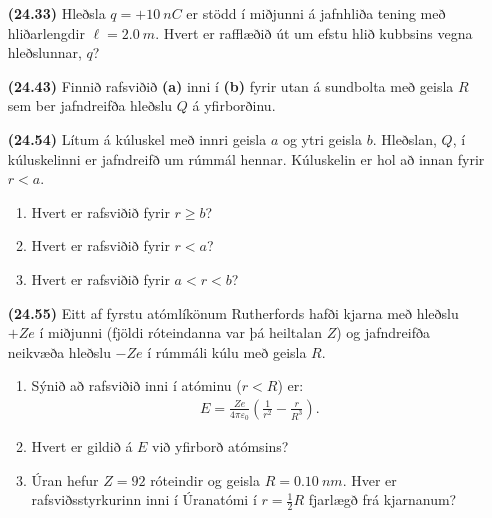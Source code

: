 \ifdefined \wholebook \else\documentclass[oneside]{book}\usepackage{EdlBook}\graphicspath{{figures/}}
\begin{document}
\begin{enumerate}[label = \textbf{(\alph*)}]

\item[\textbf{(24.33)}] Hleðsla $q = +\SI{10}{nC}$ er stödd í miðjunni á jafnhliða tening með hliðarlengdir $\ell = \SI{2.0}{m}$. Hvert er rafflæðið út um efstu hlið kubbsins vegna hleðslunnar, $q$?

\item[\textbf{(24.43)}] Finnið rafsviðið \textbf{(a)} inni í \textbf{(b)} fyrir utan á sundbolta með geisla $R$ sem ber jafndreifða hleðslu $Q$ á yfirborðinu.

\item[\textbf{(24.54)}] Lítum á kúluskel með innri geisla $a$ og ytri geisla $b$. Hleðslan, $Q$, í kúluskelinni er jafndreifð um rúmmál hennar. Kúluskelin er hol að innan fyrir $r < a$.
\begin{enumerate}[label = \textbf{(\alph*)}]
    \item Hvert er rafsviðið fyrir $r \geq b$?
    \item Hvert er rafsviðið fyrir $r < a$?
    \item Hvert er rafsviðið fyrir $a < r < b$?
\end{enumerate}

\item[\textbf{(24.55)}] Eitt af fyrstu atómlíkönum Rutherfords hafði kjarna með hleðslu $+Ze$ í miðjunni (fjöldi róteindanna var þá heiltalan $Z$) og jafndreifða neikvæða hleðslu $-Ze$ í rúmmáli kúlu með geisla $R$.
\begin{enumerate}[label = \textbf{(\alph*)}]
    \item Sýnið að rafsviðið inni í atóminu ($r < R$) er:
    \begin{align*}
        E = \frac{Ze}{4\pi \varepsilon_0} \left( \frac{1}{r^2} - \frac{r}{R^3} \right).
    \end{align*}
    \item Hvert er gildið á $E$ við yfirborð atómsins?
    \item Úran hefur $Z = 92$ róteindir og geisla $R = \SI{0.10}{nm}$. Hver er rafsviðsstyrkurinn inni í Úranatómi í $r = \frac{1}{2}R$ fjarlægð frá kjarnanum?
\end{enumerate}


\end{enumerate}
\end{document}

